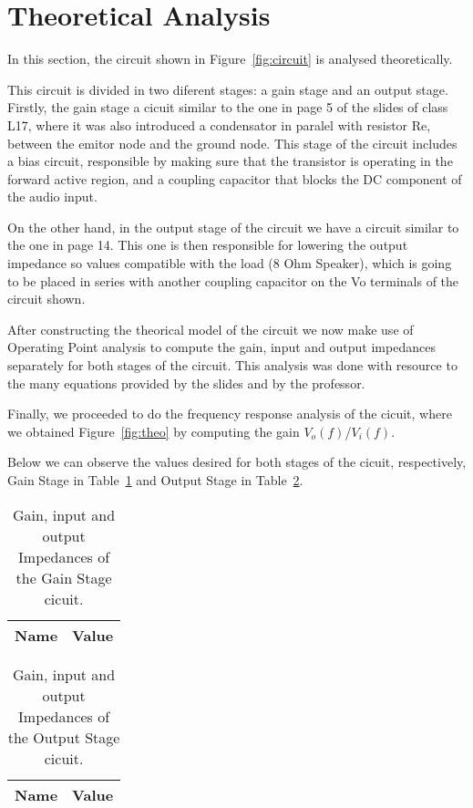 \section{Theoretical Analysis}
\label{sec:analysis}
\tab In this section, the circuit shown in Figure~\ref{fig:circuit} is analysed theoretically.

This circuit is divided in two diferent stages: a gain stage and an output stage. Firstly, the gain stage a cicuit similar to the one in page 5 of the slides of class L17, where it was also introduced a condensator in paralel with resistor Re, between the emitor node and the ground node. This stage of the circuit includes a bias circuit, responsible by making sure that the transistor is operating in the forward active region, and a coupling capacitor that blocks the DC component of the audio input.

On the other hand, in the output stage of the circuit we have a circuit similar to the one in page 14. This one is then responsible for lowering the output impedance so values compatible with the load (8 Ohm Speaker), which is going to be placed in series with another coupling capacitor on the Vo terminals of the circuit shown.

After constructing the theorical model of the circuit we now make use of Operating Point analysis to compute the gain, input and output impedances separately for both stages of the circuit. This analysis was done with resource to the many equations provided by the slides and by the professor.

Finally, we proceeded to do the frequency response analysis of the cicuit, where we obtained Figure~\ref{fig:theo} by computing the gain $V_o(f)$/$V_i(f)$.

Below we can observe the values desired for both stages of the cicuit, respectively, Gain Stage in Table~\ref{tab:gain} and Output Stage in Table~\ref{tab:output}.

\begin{table}[H]
  \centering
  \begin{tabular}{|l|r|}
    \hline    
    {\bf Name} & {\bf Value} \\ \hline
	
  \end{tabular}
  \caption{Gain, input and output Impedances of the Gain Stage cicuit.}
  \label{tab:gain}
\end{table}

\begin{table}[H]
  \centering
  \begin{tabular}{|l|r|}
    \hline    
    {\bf Name} & {\bf Value} \\ \hline
	
  \end{tabular}
  \caption{Gain, input and output Impedances of the Output Stage cicuit.}
  \label{tab:output}
\end{table}

